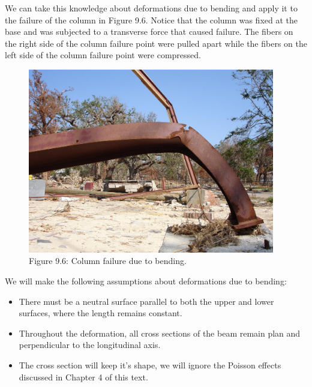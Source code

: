 \documentclass[
  letterpaper,
  DIV=11,
  numbers=noendperiod]{scrreprt}
\begin{document}
We can take this knowledge about deformations due to bending and apply
it to the failure of the column in Figure 9.6. Notice that the column
was fixed at the base and was subjected to a transverse force that
caused failure. The fibers on the right side of the column failure point
were pulled apart while the fibers on the left side of the column
failure point were compressed.

\begin{figure}[H]

{\centering \includegraphics[width=4.23958in,height=\textheight]{images/CH9 PNGs/Figure 9.6.jpg}

}

\caption{Figure 9.6: Column failure due to bending.}

\end{figure}%

We will make the following assumptions about deformations due to
bending:

\begin{itemize}
\item
  There must be a neutral surface parallel to both the upper and lower
  surfaces, where the length remains constant.
\item
  Throughout the deformation, all cross sections of the beam remain plan
  and perpendicular to the longitudinal axis.
\item
  The cross section will keep it's shape, we will ignore the Poisson
  effects discussed in Chapter 4 of this text.
\end{itemize}
\end{document}
